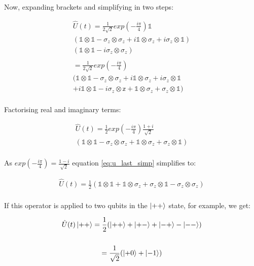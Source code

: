 Now, expanding brackets and simplifying in two steps:

\begin{multline*}
\hat{U} (t) = \frac{1}{2 \sqrt{2}}exp(-\frac{i \pi}{4}) \mathbb{1} \\
\left( \mathbb{1} \otimes \mathbb{1}
- \sigma_{z} \otimes \sigma_{z}
+ i \mathbb{1} \otimes \sigma_{z}
+ i \sigma_{z} \otimes \mathbb{1} \right) \\
\left( \mathbb{1} \otimes \mathbb{1}
- i \sigma_{z} \otimes \sigma_{z}\right) \\ \\
 = \frac{1}{2 \sqrt{2}}exp(-\frac{i \pi}{4}) \\
( \mathbb{1} \otimes \mathbb{1}
- \sigma_{z} \otimes \sigma_{z}
+ i \mathbb{1} \otimes \sigma_{z}
+ i \sigma_{z} \otimes \mathbb{1} \\
+ i \mathbb{1} \otimes \mathbb{1}
- i \sigma_{z} \otimes \mathbb{z}
+ \mathbb{1} \otimes \sigma_{z}
+ \sigma_{z} \otimes \mathbb{1} ) \\
\end{multline*}

Factorising real and imaginary terms:

\begin{multline}
\label{eq:u_last_simp}
\hat{U} (t) = \frac{1}{2}
exp(-\frac{i \pi}{4}) 
\frac{1 + i}{\sqrt{2}} \\
\left( \mathbb{1} \otimes \mathbb{1}
- \sigma_{z} \otimes \sigma_{z}
+ \mathbb{1} \otimes \sigma_{z}
+ \sigma_{z} \otimes \mathbb{1}\right) \\
\end{multline}

As $exp(-\frac{i \pi}{4}) = \frac{1 - i}{\sqrt{2}}$ equation \eqref{eq:u_last_simp} simplifies to:

\begin{multline}
\label{eq:u_final}
\hat{U} (t) = \frac{1}{2}
\left( \mathbb{1} \otimes \mathbb{1}
+ \mathbb{1} \otimes \sigma_{z}
+ \sigma_{z} \otimes \mathbb{1}
- \sigma_{z} \otimes \sigma_{z}\right) \\
\end{multline}

If this operator is applied to two qubits in the $\ket{+ +}$ state, for example, we get:

\begin{multline}
\label{eq:2qubit_example}
\hat{U} (t) \ket{+ +} = \frac{1}{2}
(\ket{++} + \ket{+-} + \ket{-+} - \ket{--}) \\ \\
= \frac{1}{\sqrt{2}} (\ket{+ 0} + \ket{- 1}) \\
\end{multline}

